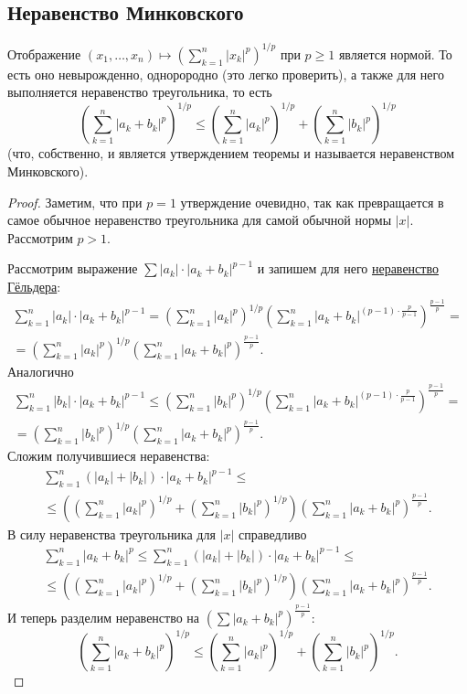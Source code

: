 \subsection{Неравенство Минковского}

\begin{ntheorem}
	Отображение \(\displaystyle (x_1, \ldots, x_n) \mapsto \left(\sum_{k=1}^n |x_k|^p \right)^{1/p}\) при \(p \geqslant 1\) является нормой. То есть оно невырожденно, однорородно (это легко проверить), а также для него выполняется неравенство треугольника, то есть \[
		\left(\sum_{k=1}^n |a_k + b_k|^p \right)^{1/p} \leqslant \left(\sum_{k=1}^n |a_k|^p \right)^{1/p} + \left(\sum_{k=1}^n |b_k|^p \right)^{1/p}
	\]
	(что, собственно, и является утверждением теоремы и называется неравенством Минковского).
\end{ntheorem}
\begin{proof}
	Заметим, что при \(p = 1\) утверждение очевидно, так как превращается в самое обычное неравенство треугольника для самой обычной нормы \(|x|\). Рассмотрим \(p > 1\).
	
	Рассмотрим выражение \(\sum |a_k| \cdot |a_k + b_k|^{p-1}\) и запишем для него \hyperlink{Гёльдер-суммы}{неравенство Гёльдера}:
	\begin{multline*}
		\sum_{k=1}^n |a_k| \cdot |a_k + b_k|^{p-1} = \left(\sum_{k=1}^n |a_k|^p \right)^{1/p} \left(\sum_{k=1}^n |a_k + b_k|^{(p - 1) \cdot \frac{p}{p-1}} \right)^{\frac{p-1}{p}} = \\
		= \left(\sum_{k=1}^n |a_k|^p \right)^{1/p} \left(\sum_{k=1}^n |a_k + b_k|^p \right)^{\frac{p-1}{p}}.
	\end{multline*}
	Аналогично
	\begin{multline*}
		\sum_{k=1}^n |b_k| \cdot |a_k + b_k|^{p-1} \leqslant \left(\sum_{k=1}^n |b_k|^p \right)^{1/p} \left(\sum_{k=1}^n |a_k + b_k|^{(p - 1) \cdot \frac{p}{p-1}} \right)^{\frac{p-1}{p}} = \\
		= \left(\sum_{k=1}^n |b_k|^p \right)^{1/p} \left(\sum_{k=1}^n |a_k + b_k|^p \right)^{\frac{p-1}{p}}.
	\end{multline*}
	Сложим получившиеся неравенства:
	\begin{multline*}
		\sum_{k=1}^n (|a_k| + |b_k|) \cdot |a_k + b_k|^{p-1} \leqslant \\
		\leqslant \left(\left(\sum_{k=1}^n |a_k|^p \right)^{1/p} + \left(\sum_{k=1}^n |b_k|^p \right)^{1/p} \right) \left(\sum_{k=1}^n |a_k + b_k|^p \right)^{\frac{p-1}{p}}.
	\end{multline*}
	В силу неравенства треугольника для \(|x|\) справедливо 
	\begin{multline*}
		\sum_{k=1}^n |a_k + b_k|^p \leqslant \sum_{k=1}^n (|a_k| + |b_k|) \cdot |a_k + b_k|^{p-1} \leqslant \\
		\leqslant \left(\left(\sum_{k=1}^n |a_k|^p \right)^{1/p} + \left(\sum_{k=1}^n |b_k|^p \right)^{1/p} \right) \left(\sum_{k=1}^n |a_k + b_k|^p \right)^{\frac{p-1}{p}}.
	\end{multline*}
	И теперь разделим неравенство на \((\sum |a_k + b_k|^p)^{\frac{p-1}{p}}\): \[
		\left(\sum_{k=1}^n |a_k + b_k|^p\right)^{1/p} \leqslant \left(\sum_{k=1}^n |a_k|^p \right)^{1/p} + \left(\sum_{k=1}^n |b_k|^p \right)^{1/p}.
	\]
\end{proof}

